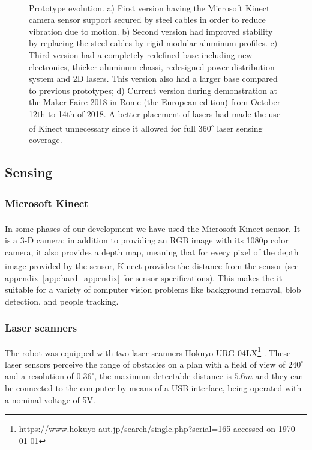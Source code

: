 \begin{figure}[H]
      \caption{Prototype evolution. a) First version having the Microsoft Kinect\textsuperscript{\textregistered} camera sensor support secured by steel cables in order to reduce vibration due to motion. b) Second version had improved stability by replacing the steel cables by rigid modular aluminum profiles. c) Third version had a completely redefined base including new electronics, thicker aluminum chassi, redesigned power distribution system and 2D lasers. This version also had a larger base compared to previous prototypes; d) Current version during demonstration at the Maker Faire 2018 in Rome (the European edition) from October 12th to 14th of 2018. A better placement of lasers had made the use of Kinect\textsuperscript{\textregistered} unnecessary since it allowed for full 360\textsuperscript{$\circ$} laser sensing coverage.}
      \label{fig:evolution}
\end{figure}

\subsection{Sensing}
\subsubsection{Microsoft Kinect\textsuperscript{\textregistered}\label{sec:kinectsec}}
In some phases of our development we have used the Microsoft Kinect\textsuperscript{\textregistered} sensor. It is a 3-D camera: in addition to providing an RGB image with its 1080p color camera, it also provides a depth map,  meaning that for every pixel of the depth image provided by the sensor, Kinect\textsuperscript{\textregistered} provides the distance from the sensor (see appendix~\ref{app:hard_appendix} for sensor specifications). This makes the it suitable for a variety of computer vision problems like background removal, blob detection, and people tracking.

\subsubsection{Laser scanners}\label{lasershokuyo}
The robot was equipped with two laser scanners Hokuyo URG-04LX\footnote{\url{https://www.hokuyo-aut.jp/search/single.php?serial=165} accessed on \today}
. These laser sensors perceive the range of obstacles on a plan with a field of view of $240^\circ$ and a resolution of $0.36^\circ$, the maximum detectable distance is $5.6m$ and they can be connected to the computer by means of a USB interface, being operated with a nominal voltage of 5V.

